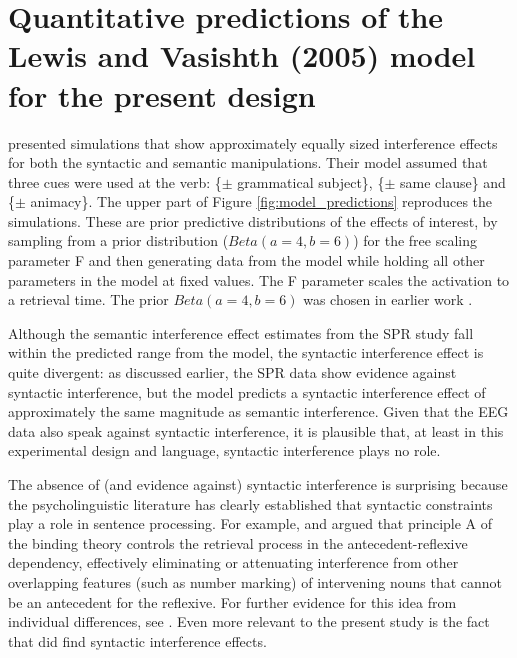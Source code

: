 \documentclass[a4paper, man, floatsintext]{apa7}
\begin{document}
\section{Quantitative predictions of the Lewis and Vasishth (2005) model for the present design}

\textcite{mertzen} presented simulations that show approximately equally sized interference effects 
for both the syntactic and semantic manipulations. Their model assumed that three cues were used at the verb:  \{$\pm$ grammatical subject\}, \{$\pm$ same clause\} and \{$\pm$ animacy\}. The upper part of Figure \ref{fig:model_predictions} reproduces the \textcite{mertzen}   simulations. These are prior predictive distributions of the effects of interest, by sampling from a prior distribution ($Beta(a=4,b=6)$) for the free scaling parameter F and then generating data from the model while holding all other parameters in the model at fixed values. The F parameter scales the activation to a retrieval time. The prior $Beta(a=4,b=6)$ was chosen in earlier work \parencite{jaeger_etal_2020}. 

Although the semantic interference effect estimates from the SPR study fall within the predicted range from the model, the syntactic interference effect is quite divergent: as discussed earlier, the SPR data show evidence against syntactic interference, but the model predicts a syntactic interference effect of approximately the same magnitude as semantic interference. Given that the EEG data also speak against syntactic interference, it is plausible that, at least in this experimental design and language, syntactic interference plays no role. 

The absence of (and evidence against) syntactic interference is surprising because the psycholinguistic literature has clearly established that syntactic constraints play a role in sentence processing. For example, \textcite{dillon2013} and \textcite{Sturt2003} argued that principle A of the binding theory controls the retrieval process in the antecedent-reflexive dependency, effectively eliminating or attenuating interference from other overlapping features (such as number marking) of intervening nouns that cannot be an antecedent for the reflexive. For further evidence for this idea from individual differences, see \textcite{yadav2021individual}. Even more relevant to the present study is the fact that \textcite{mertzen} did find syntactic interference effects. 
\end{document}
